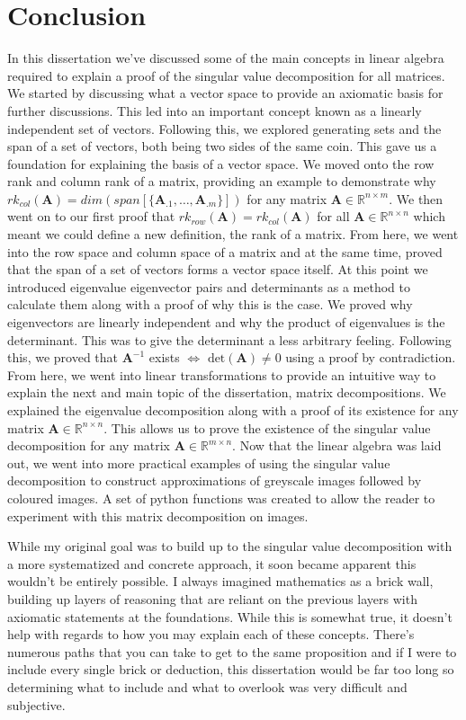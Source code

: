 \documentclass[a4paper,12pt]{article}
\newcommand{\matrx}[1]{\bm{#1}}
\newcommand{\real}{\mathbb{R}}
\newcommand{\rrank}[1]{rk_{row}(\matrx{#1})}
\newcommand{\crank}[1]{rk_{col}(\matrx{#1})}
\newcommand{\dett}[1]{\text{det}(\matrx{#1})}
\begin{document}
	\section{Conclusion}
	In this dissertation we've discussed some of the main concepts in linear algebra required to explain a proof of the singular value decomposition for all matrices. We started by discussing what a vector space to provide an axiomatic basis for further discussions. This led into an important concept known as a linearly independent set of vectors. Following this, we explored generating sets and the span of a set of vectors, both being two sides of the same coin. This gave us a foundation for explaining the basis of a vector space. We moved onto the row rank and column rank of a matrix, providing an example to demonstrate why $ \crank{A} = dim(span[\{\matrx{A}_{.1}, \ldots, \matrx{A}_{.m}\}]) $ for any matrix $ \matrx{A} \in \real^{n \times m} $. We then went on to our first proof that $ \rrank{A} = \crank{A} $ for all $ \matrx{A} \in \real^{n \times n} $ which meant we could define a new definition, the rank of a matrix. From here, we went into the row space and column space of a matrix and at the same time, proved that the span of a set of vectors forms a vector space itself. At this point we introduced eigenvalue eigenvector pairs and determinants as a method to calculate them along with a proof of why this is the case. We proved why eigenvectors are linearly independent and why the product of eigenvalues is the determinant. This was to give the determinant a less arbitrary feeling. Following this, we proved that  $ \matrx{A}^{-1} $ exists $\iff$ $ \dett{A} \ne 0 $ using a proof by contradiction. From here, we went into linear transformations to provide an intuitive way to explain the next and main topic of the dissertation, matrix decompositions. We explained the eigenvalue decomposition along with a proof of its existence for any matrix $ \matrx{A} \in \real^{n \times n} $. This allows us to prove the existence of the singular value decomposition for any matrix $ \matrx{A} \in \real^{m \times n} $. Now that the linear algebra was laid out, we went into more practical examples of using the singular value decomposition to construct approximations of greyscale images followed by coloured images. A set of python functions was created to allow the reader to experiment with this matrix decomposition on images. 
	
	While my original goal was to build up to the singular value decomposition with a more systematized and concrete approach, it soon became apparent this wouldn't be entirely possible. I always imagined mathematics as a brick wall, building up layers of reasoning that are reliant on the previous layers with axiomatic statements at the foundations. While this is somewhat true, it doesn't help with regards to how you may explain each of these concepts. There's numerous paths that you can take to get to the same proposition and if I were to include every single brick or deduction, this dissertation would be far too long so determining what to include and what to overlook was very difficult and subjective. 
	
\end{document}
